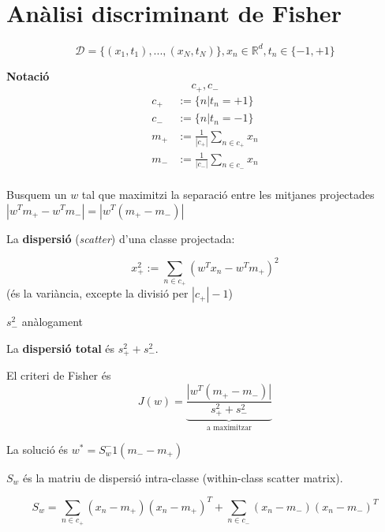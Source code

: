 \documentclass[a4paper]{article}
\begin{document}
	\section{Anàlisi discriminant de Fisher}
	$$  \mathcal{D} = \{(x_1, t_1), ..., (x_N, t_N)\}, x_n \in \mathbb{R}^d, t_n \in \{-1, +1 \}  $$
	
	
	\textbf{Notació}
	$$  c_+, c_-  $$
	\begin{align*}
		c_+ &:= \{ n | t_n = +1 \} \\
		c_- &:= \{ n | t_n = -1 \} \\
		m_+ &:= \frac{1}{|c_+|} \sum_{n\in c_+} x_n \\
		m_- &:= \frac{1}{|c_-|} \sum_{n\in c_-} x_n \\
	\end{align*}
	
	Busquem un $w$ tal que maximitzi la separació entre les mitjanes projectades $|w^Tm_+ - w^Tm_-| = |w^T(m_+ - m_-)|$
	
	La \textbf{dispersió} (\emph{scatter}) d'una classe projectada:
	
	$$  x_+^2 := \sum_{n \in c_+} (w^Tx_n - w^Tm_+)^2  $$
	(és la variància, excepte la divisió per $|c_+| - 1$)

	$s_-^2$ anàlogament
	
	La \textbf{dispersió total} és $s_+^2 + s_-^2$.
	
	El criteri de Fisher és $$  J(w) = \underbrace{\frac{|w^T(m_+-m_-)|}{s_+^2 + s_-^2}}_\text{a maximitzar}  $$
	
	La solució és $w^* = S_w^-1(m_- - m_+)$
	
	$S_w$ és la matriu de dispersió intra-classe (within-class scatter matrix).
	
	$$  S_w = \sum_{n \in c_+} (x_n - m_+)(x_n - m_+)^T + \sum_{n \in c_-} (x_n - m_-)(x_n - m_-)^T  $$
	
\end{document}
